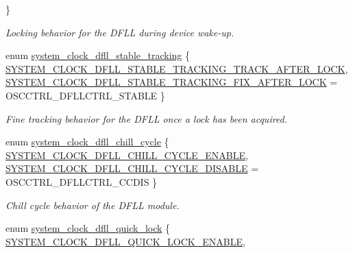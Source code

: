 \begin{DoxyCompactItemize}
 \}
\begin{DoxyCompactList}\small\item\em Locking behavior for the D\+F\+L\+L during device wake-\/up. \end{DoxyCompactList}\item 
enum \hyperlink{group__asfdoc__sam0__system__clock__group_gaf9b0eb010541f1d7c8af3eeb0573043d}{system\+\_\+clock\+\_\+dfll\+\_\+stable\+\_\+tracking} \{ \hyperlink{group__asfdoc__sam0__system__clock__group_ggaf9b0eb010541f1d7c8af3eeb0573043da4a92b58e1ea9c95123b83aa6ee4e3f21}{S\+Y\+S\+T\+E\+M\+\_\+\+C\+L\+O\+C\+K\+\_\+\+D\+F\+L\+L\+\_\+\+S\+T\+A\+B\+L\+E\+\_\+\+T\+R\+A\+C\+K\+I\+N\+G\+\_\+\+T\+R\+A\+C\+K\+\_\+\+A\+F\+T\+E\+R\+\_\+\+L\+O\+C\+K}, 
\hyperlink{group__asfdoc__sam0__system__clock__group_ggaf9b0eb010541f1d7c8af3eeb0573043da40176c0aa1d57b6ec9f7de182b937c5a}{S\+Y\+S\+T\+E\+M\+\_\+\+C\+L\+O\+C\+K\+\_\+\+D\+F\+L\+L\+\_\+\+S\+T\+A\+B\+L\+E\+\_\+\+T\+R\+A\+C\+K\+I\+N\+G\+\_\+\+F\+I\+X\+\_\+\+A\+F\+T\+E\+R\+\_\+\+L\+O\+C\+K} = O\+S\+C\+C\+T\+R\+L\+\_\+\+D\+F\+L\+L\+C\+T\+R\+L\+\_\+\+S\+T\+A\+B\+L\+E
 \}
\begin{DoxyCompactList}\small\item\em Fine tracking behavior for the D\+F\+L\+L once a lock has been acquired. \end{DoxyCompactList}\item 
enum \hyperlink{group__asfdoc__sam0__system__clock__group_ga04ee95a872995397e3db9cf1494721e3}{system\+\_\+clock\+\_\+dfll\+\_\+chill\+\_\+cycle} \{ \hyperlink{group__asfdoc__sam0__system__clock__group_gga04ee95a872995397e3db9cf1494721e3ad75095e64d38dbba6451c496645b7e01}{S\+Y\+S\+T\+E\+M\+\_\+\+C\+L\+O\+C\+K\+\_\+\+D\+F\+L\+L\+\_\+\+C\+H\+I\+L\+L\+\_\+\+C\+Y\+C\+L\+E\+\_\+\+E\+N\+A\+B\+L\+E}, 
\hyperlink{group__asfdoc__sam0__system__clock__group_gga04ee95a872995397e3db9cf1494721e3a1f84a60dcc044d7bc33cf71cddb985a3}{S\+Y\+S\+T\+E\+M\+\_\+\+C\+L\+O\+C\+K\+\_\+\+D\+F\+L\+L\+\_\+\+C\+H\+I\+L\+L\+\_\+\+C\+Y\+C\+L\+E\+\_\+\+D\+I\+S\+A\+B\+L\+E} = O\+S\+C\+C\+T\+R\+L\+\_\+\+D\+F\+L\+L\+C\+T\+R\+L\+\_\+\+C\+C\+D\+I\+S
 \}
\begin{DoxyCompactList}\small\item\em Chill cycle behavior of the D\+F\+L\+L module. \end{DoxyCompactList}\item 
enum \hyperlink{group__asfdoc__sam0__system__clock__group_ga56ab87696abcd4e0103d6259386017ae}{system\+\_\+clock\+\_\+dfll\+\_\+quick\+\_\+lock} \{ \hyperlink{group__asfdoc__sam0__system__clock__group_gga56ab87696abcd4e0103d6259386017aea0599c04b640c394c9fba065ae8e8b616}{S\+Y\+S\+T\+E\+M\+\_\+\+C\+L\+O\+C\+K\+\_\+\+D\+F\+L\+L\+\_\+\+Q\+U\+I\+C\+K\+\_\+\+L\+O\+C\+K\+\_\+\+E\+N\+A\+B\+L\+E}, 

\end{DoxyCompactItemize}
